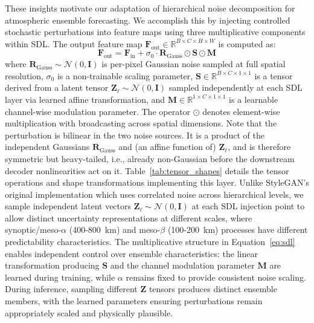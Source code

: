 \documentclass{agujournal2019}
\begin{document}
These insights motivate our adaptation of hierarchical noise decomposition for atmospheric ensemble forecasting. We accomplish this by injecting controlled stochastic perturbations into feature maps using three multiplicative components within SDL. The output feature map $\mathbf{F}_{\text{out}} \in \mathbb{R}^{B \times C \times H \times W}$ is computed as:
\begin{equation}
\mathbf{F}_{\text{out}} = \mathbf{F}_{\text{in}} + \sigma_0 \cdot \mathbf{R}_{\text{Gauss}}  \odot \mathbf{S} \odot \mathbf{M}
\label{eq:sdl}
\end{equation}
where $\mathbf{R}_{\text{Gauss}} \sim \mathcal{N}(0, \mathbf{I})$ is per-pixel Gaussian noise sampled at full spatial resolution, $\sigma_0$ is a non-trainable scaling parameter, $\mathbf{S} \in \mathbb{R}^{B \times C \times 1 \times 1}$ is a tensor derived from a latent tensor $\mathbf{Z}_\ell \sim \mathcal{N}(0, \mathbf{I})$ sampled independently at each SDL layer via learned affine transformation, and $\mathbf{M} \in \mathbb{R}^{1 \times C \times 1 \times 1}$ is a learnable channel-wise modulation parameter. The operator $\odot$ denotes element-wise multiplication with broadcasting across spatial dimensions. Note that the perturbation is bilinear in the two noise sources. It is a product of the independent Gaussians $\mathbf{R}_{\text{Gauss}}$ and (an affine function of) $\mathbf{Z}_\ell$, and is therefore symmetric but heavy-tailed, i.e., already non-Gaussian before the downstream decoder nonlinearities act on it. Table~\ref{tab:tensor_shapes} details the tensor operations and shape transformations implementing this layer. Unlike StyleGAN's original implementation which uses correlated noise across hierarchical levels, we sample independent latent vectors $\mathbf{Z}_\ell \sim \mathcal{N}(0, \mathbf{I})$ at each SDL injection point to allow distinct uncertainty representations at different scales, where synoptic/meso-$\alpha$ (400-800~km) and meso-$\beta$ (100-200~km) processes have different predictability characteristics. The multiplicative structure in Equation~\ref{eq:sdl} enables independent control over ensemble characteristics: the linear transformation producing $\mathbf{S}$ and the channel modulation parameter $\mathbf{M}$ are learned during training, while $\alpha$ remains fixed to provide consistent noise scaling. During inference, sampling different $\mathbf{Z}$ tensors produces distinct ensemble members, with the learned parameters ensuring perturbations remain appropriately scaled and physically plausible.
\end{document}
